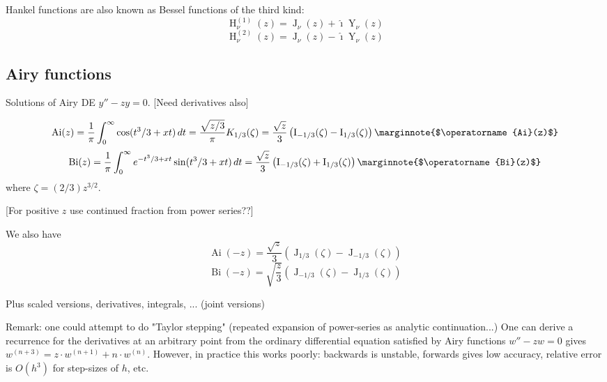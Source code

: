 \documentclass[10pt,dvipdfmx,letterpaper,twoside]{article}
\let\O=\operatorname
\newcommand{\ii}{{\hat{\imath}}}
\let\DEF=\marginnote
\begin{document}
Hankel functions are also known as Bessel functions of the third kind:
\[ \O{H}^{(1)}_\nu(z) = \O{J}_\nu(z) + \ii\O{Y}_\nu(z) \]
\[ \O{H}^{(2)}_\nu(z) = \O{J}_\nu(z) - \ii\O{Y}_\nu(z) \]

\subsection{Airy functions}
Solutions of Airy DE $y'' - z y = 0$.
[Need derivatives also]

\[ \O{Ai}(z) = \frac1\pi \int_0^\infty \cos(t^3/3 + xt)\,dt
  = \frac{\sqrt{z/3}}{\pi}K_{1/3}(\zeta)
  = \frac{\sqrt{z}}{3}\left( \O{I}_{-1/3}(\zeta) - \O{I}_{1/3}(\zeta) \right)
  \DEF{$\O{Ai}(z)$} \]
\[ \O{Bi}(z) = \frac1\pi \int_0^\infty e^{-t^3/3 + xt}\sin(t^3/3 + xt)\,dt
  = \frac{\sqrt{z}}{3}\left( \O{I}_{-1/3}(\zeta) + \O{I}_{1/3}(\zeta) \right)
  \DEF{$\O{Bi}(z)$} \]
where $\zeta = (2/3)z^{3/2}$.

[For positive $z$ use continued fraction from power series??]

We also have
\[ \O{Ai}(-z) = \frac{\sqrt{z}}{3}\left( \O{J}_{1/3}(\zeta) - \O{J}_{-1/3}(\zeta) \right) \]
\[ \O{Bi}(-z) = \sqrt{\frac{z}{3}}\left( \O{J}_{-1/3}(\zeta) - \O{J}_{1/3}(\zeta) \right) \]

Plus scaled versions, derivatives, integrals, ...
(joint versions)

Remark: one could attempt to do "Taylor stepping" (repeated expansion of power-series as analytic continuation...)
One can derive a recurrence for the derivatives at an arbitrary point from the ordinary differential equation satisfied
by Airy functions $w'' - zw = 0$ gives $w^{(n+3)} = z\cdot w^{(n+1)} + n\cdot w^{(n)}$.  However, in practice this works
poorly: backwards is unstable, forwards gives low accuracy, relative error is $O(h^3)$ for step-sizes of $h$, etc.
\end{document}
